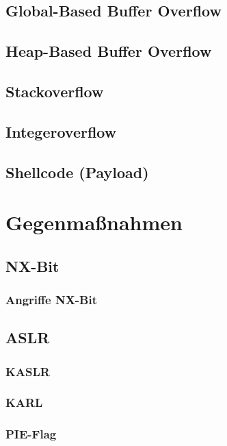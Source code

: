\documentclass[12pt]{book}
\begin{document}
\section{Global-Based Buffer Overflow}

\section{Heap-Based Buffer Overflow}

\section{Stackoverflow}

\section{Integeroverflow}

\section{Shellcode (Payload)}

\chapter{Gegenmaßnahmen}

\section{NX-Bit}

\subsection{Angriffe NX-Bit}

\section{ASLR}

\subsection{KASLR}

\subsection{KARL}

\subsection{PIE-Flag}
\end{document}
